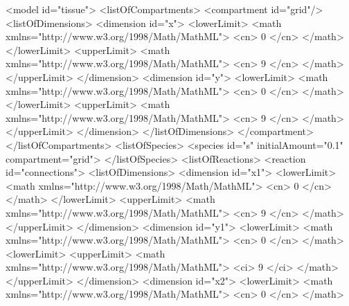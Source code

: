 \documentclass{cekarticle}
\begin{document}
\begin{example}
<model id="tissue">
    <listOfCompartments>
        <compartment id="grid"/>
            <listOfDimensions>
                <dimension id="x">
                    <lowerLimit>
                        <math xmlns="http://www.w3.org/1998/Math/MathML">
                            <cn> 0 </cn>
                        </math>
                    </lowerLimit>
                    <upperLimit>
                        <math xmlns="http://www.w3.org/1998/Math/MathML">
                            <cn> 9 </cn>
                        </math>
                    </upperLimit>
                </dimension>
                <dimension id="y">
                    <lowerLimit>
                        <math xmlns="http://www.w3.org/1998/Math/MathML">
                            <cn> 0 </cn>
                        </math>
                    </lowerLimit>
                    <upperLimit>
                        <math xmlns="http://www.w3.org/1998/Math/MathML">
                            <cn> 9 </cn>
                        </math>
                    </upperLimit>
                </dimension>
            </listOfDimensions>
        </compartment>
    </listOfCompartments>
    <listOfSpecies>
        <species id="s" initialAmount="0.1" compartment="grid">
    </listOfSpecies>
    <listOfReactions>
        <reaction id="connections">
            <listOfDimensions>
                <dimension id="x1">
                    <lowerLimit>
                        <math xmlns="http://www.w3.org/1998/Math/MathML">
                            <cn> 0 </cn>
                        </math>
                    </lowerLimit>
                    <upperLimit>
                        <math xmlns="http://www.w3.org/1998/Math/MathML">
                            <cn> 9 </cn>
                        </math>
                    </upperLimit>
                </dimension>
                <dimension id="y1">
                    <lowerLimit>
                        <math xmlns="http://www.w3.org/1998/Math/MathML">
                            <cn> 0 </cn>
                        </math>
                    <lowerLimit>
                    <upperLimit>
                        <math xmlns="http://www.w3.org/1998/Math/MathML">
                            <ci> 9 </ci>
                        </math>
                    </upperLimit>
                </dimension>
                <dimension id="x2">
                    <lowerLimit>
                        <math xmlns="http://www.w3.org/1998/Math/MathML">
                            <cn> 0 </cn>
                        </math>

\end{example}
\end{document}

